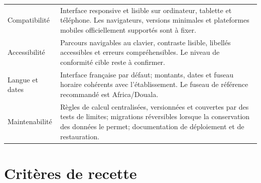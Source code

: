 \documentclass[11pt,a4paper]{article}
\begin{document}
\begin{longtable}{L{3.2cm}L{12.1cm}}
Compatibilité & Interface responsive et lisible sur ordinateur, tablette et téléphone. Les navigateurs, versions minimales et plateformes mobiles officiellement supportés sont à fixer. \\
Accessibilité & Parcours navigables au clavier, contraste lisible, libellés accessibles et erreurs compréhensibles. Le niveau de conformité cible reste à confirmer. \\
Langue et dates & Interface française par défaut; montants, dates et fuseau horaire cohérents avec l'établissement. Le fuseau de référence recommandé est Africa/Douala. \\
Maintenabilité & Règles de calcul centralisées, versionnées et couvertes par des tests de limites; migrations réversibles lorsque la conservation des données le permet; documentation de déploiement et de restauration. \\
\bottomrule
\end{longtable}

\section{Critères de recette}
\end{document}
